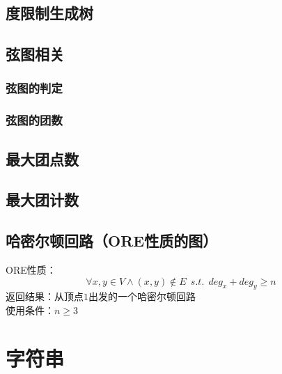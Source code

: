\documentclass[landscape, oneside, a4paper, cs4size]{book}
\begin{document}
\begin{multicols}{2}
			\section{度限制生成树}
			\begin{spacing}{0.8}
				
			\end{spacing}
			\section{弦图相关}
			\begin{spacing}{0.8}
				\subsection{弦图的判定}
					
				\subsection{弦图的团数}
					
			\end{spacing}
			\section{最大团点数}
			\begin{spacing}{0.8}
				
			\end{spacing}
			\section{最大团计数}
			\begin{spacing}{0.8}
				
			\end{spacing}
			\section{哈密尔顿回路（ORE性质的图）}
			\begin{spacing}{0.8}
				ORE性质：$$\forall x,y \in V \wedge (x,y) \notin E \ \ s.t. \ \ deg_x+deg_y \geq n$$
				\indent 返回结果：从顶点$1$出发的一个哈密尔顿回路\\
				\indent 使用条件：$n \geq 3$
				
			\end{spacing}
		\chapter{字符串}

\end{multicols}
\end{document}
